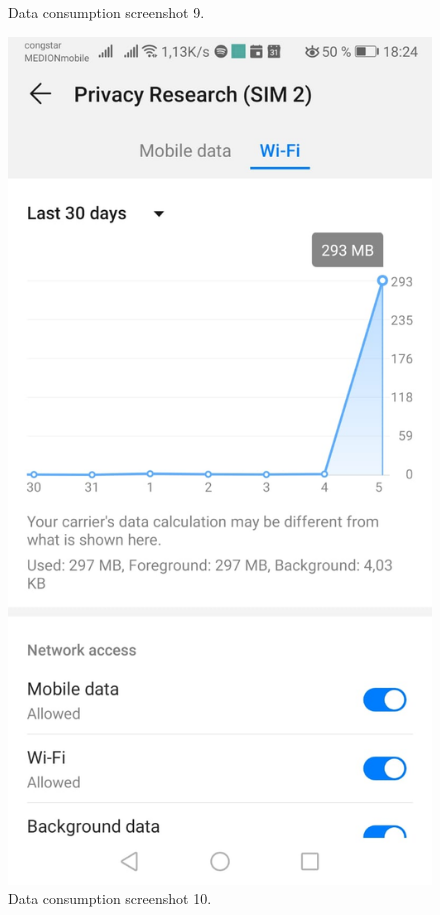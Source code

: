 \begin{figure}
\begin{minipage}{.45\textwidth}
\begin{center}
		\caption{Data consumption screenshot 9.}
		\end{center}
	\end{minipage}
	\hfill
	\begin{minipage}{.45\textwidth}
		\begin{center}
		\includegraphics[width=\textwidth]{data/data-usage/data-usage9-1.jpeg}
		\caption{Data consumption screenshot 10.}
		\end{center}
	\end{minipage}
\end{figure}

